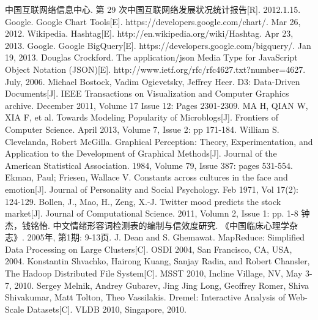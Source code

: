 \titleformat{\chapter}{\centering\hei\xiaosanhao}{\chaptername}{0pt}{}
\renewcommand{\bibname}{参考文献}
\begin{thebibliography}{8}
\thispagestyle{fancy}
 中国互联网络信息中心. 第 29 次中国互联网络发展状况统计报告[R]. 2012.1.15.
 Google. Google Chart Tools[E]. https://developers.google.com/chart/. Mar 26, 2012.
 Wikipedia. Hashtag[E]. http://en.wikipedia.org/wiki/Hashtag. Apr 23, 2013.
 Google. Google BigQuery[E]. https://developers.google.com/bigquery/. Jan 19, 2013.
 Douglas Crockford. The application/json Media Type for JavaScript Object Notation (JSON)[E]. http://www.ietf.org/rfc/rfc4627.txt?number=4627. July, 2006.
 Michael Bostock, Vadim Ogievetsky, Jeffrey Heer. D3: Data-Driven Documents[J]. IEEE Transactions on Visualization and Computer Graphics archive. December 2011, 
Volume 17 Issue 12: Pages 2301-2309.
 MA H, QIAN W, XIA F, et al. Towards Modeling Popularity of Microblogs[J]. Frontiers of Computer Science. April 2013, Volume 7, Issue 2: pp 171-184.
 William S. Clevelanda, Robert McGilla. Graphical Perception: Theory, Experimentation, and Application to the Development of Graphical Methods[J]. Journal of the American Statistical Association. 1984, Volume 79, Issue 387: pages 531-554.
 Ekman, Paul; Friesen, Wallace V. Constants across cultures in the face and emotion[J].
Journal of Personality and Social Psychology. Feb 1971,  Vol 17(2): 124-129.
 Bollen, J., Mao, H., Zeng, X.-J. Twitter mood predicts the stock market[J]. Journal of Computational Science. 2011, Volumn 2, Issue 1: pp. 1-8 
 钟杰，钱铭怡. 中文情绪形容词检测表的编制与信效度研究. 《中国临床心理学杂志》. 2005年, 第1期: 9-13页.
 J. Dean and S. Ghemawat. MapReduce: Simplified Data Processing on Large Clusters[C]. OSDI 2004, San Francisco, CA, USA, 2004.
 Konstantin Shvachko, Hairong Kuang, Sanjay Radia, and Robert Chansler, The Hadoop Distributed File System[C]. MSST 2010, Incline Village, NV, May 3-7, 2010.
 Sergey Melnik, Andrey Gubarev, Jing Jing Long, Geoffrey Romer, Shiva Shivakumar, Matt Tolton, Theo Vassilakis. Dremel: Interactive Analysis of Web-Scale Datasets[C]. VLDB 2010, Singapore, 2010.


\end{thebibliography}
